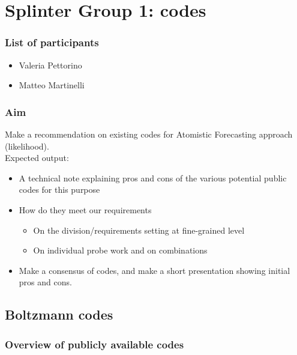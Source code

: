 



%

\section{Splinter Group 1: codes}

\subsubsection*{List of participants}
\begin{itemize}
 \item Valeria Pettorino
 \item Matteo Martinelli
\end{itemize}

\subsubsection*{Aim}
Make a recommendation on existing codes for Atomistic Forecasting approach (likelihood).\\
Expected output:
\begin{itemize}
 \item A technical note explaining pros and cons of the various potential public codes for this purpose 
 \item How do they meet our requirements
 \begin{itemize}
  \item On the division/requirements setting at fine-grained level 
  \item On individual probe work and on combinations
 \end{itemize}
 \item Make a consensus of codes, and make a short presentation showing initial pros and cons.
\end{itemize}

\subsection{Boltzmann codes}

\subsubsection{Overview of publicly available codes}



